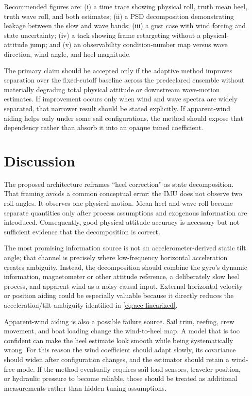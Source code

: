 \documentclass[conference]{IEEEtran}
\begin{document}
Recommended figures are: (i) a time trace showing physical roll, truth mean heel, truth
wave roll, and both estimates; (ii) a PSD decomposition demonstrating leakage between the
slow and wave bands; (iii) a gust case with wind forcing and state uncertainty; (iv) a
tack showing frame retargeting without a physical-attitude jump; and (v) an observability
condition-number map versus wave direction, wind angle, and heel magnitude.

The primary claim should be accepted only if the adaptive method improves separation over
the fixed-cutoff baseline across the predeclared ensemble without materially degrading
total physical attitude or downstream wave-motion estimates. If improvement occurs only
when wind and wave spectra are widely separated, that narrower result should be stated
explicitly. If apparent-wind aiding helps only under some sail configurations, the method
should expose that dependency rather than absorb it into an opaque tuned coefficient.

\section{Discussion}
\label{sec:discussion}

The proposed architecture reframes ``heel correction'' as state decomposition. That
framing avoids a common conceptual error: the IMU does not observe two roll angles. It
observes one physical motion. Mean heel and wave roll become separate quantities only
after process assumptions and exogenous information are introduced. Consequently, good
physical-attitude accuracy is necessary but not sufficient evidence that the decomposition
is correct.

The most promising information source is not an accelerometer-derived static tilt angle;
that channel is precisely where low-frequency horizontal acceleration creates ambiguity.
Instead, the decomposition should combine the gyro's dynamic information, magnetometer or
other attitude reference, a deliberately slow heel process, and apparent wind as a noisy
causal input. External horizontal velocity or position aiding could be especially
valuable because it directly reduces the acceleration/tilt ambiguity identified in
\eqref{eq:acc-linearized}.

Apparent-wind aiding is also a possible failure source. Sail trim, reefing, crew movement,
and boat loading change the wind-to-heel map. A model that is too confident can make the
heel estimate look smooth while being systematically wrong. For this reason the wind
coefficient should adapt slowly, its covariance should widen after configuration changes,
and the estimator should retain a wind-free mode. If the method eventually requires sail
load sensors, traveler position, or hydraulic pressure to become reliable, those should
be treated as additional measurements rather than hidden tuning assumptions.
\end{document}
